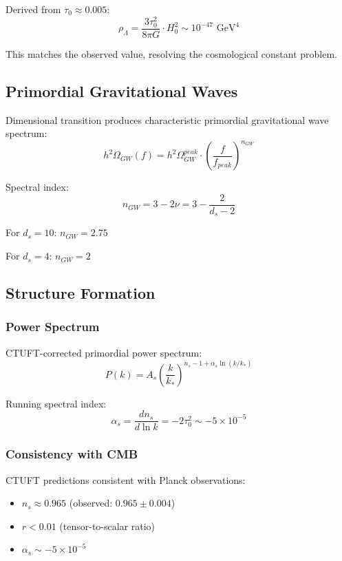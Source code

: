 Derived from $\tau_0 \approx 0.005$:
\begin{equation}
    \rho_\Lambda = \frac{3\tau_0^2}{8\pi G} \cdot H_0^2 \sim 10^{-47} \text{ GeV}^4
\end{equation}

This matches the observed value, resolving the cosmological constant problem.

\subsection{Primordial Gravitational Waves}

Dimensional transition produces characteristic primordial gravitational wave spectrum:
\begin{equation}
    h^2\Omega_{GW}(f) = h^2\Omega_{GW}^{peak} \cdot \left(\frac{f}{f_{peak}}\right)^{n_{GW}}
\end{equation}

Spectral index:
\begin{equation}
    n_{GW} = 3 - 2\nu = 3 - \frac{2}{d_s - 2}
\end{equation}

For $d_s = 10$: $n_{GW} = 2.75$

For $d_s = 4$: $n_{GW} = 2$

\subsection{Structure Formation}

\subsubsection{Power Spectrum}

CTUFT-corrected primordial power spectrum:
\begin{equation}
    P(k) = A_s \left(\frac{k}{k_*}\right)^{n_s - 1 + \alpha_s \ln(k/k_*)}
\end{equation}

Running spectral index:
\begin{equation}
    \alpha_s = \frac{dn_s}{d\ln k} = -2\tau_0^2 \sim -5 \times 10^{-5}
\end{equation}

\subsubsection{Consistency with CMB}

CTUFT predictions consistent with Planck observations:
\begin{itemize}
    \item $n_s \approx 0.965$ (observed: $0.965 \pm 0.004$)
    \item $r < 0.01$ (tensor-to-scalar ratio)
    \item $\alpha_s \sim -5 \times 10^{-5}$
\end{itemize}

